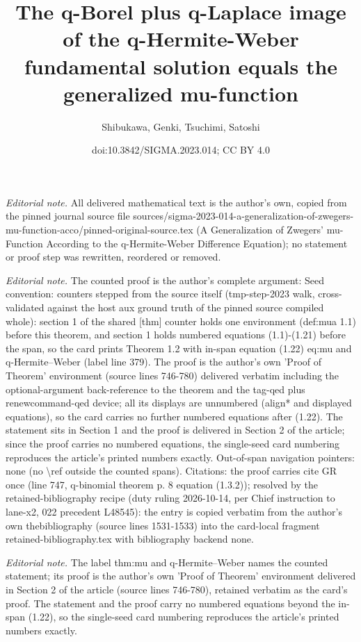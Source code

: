 \documentclass[10pt,a4paper]{article}
\title{The q-Borel plus q-Laplace image of the q-Hermite-Weber fundamental solution equals the generalized mu-function}
\author{Shibukawa, Genki, Tsuchimi, Satoshi}
\date{doi:10.3842/SIGMA.2023.014; CC BY 4.0}
\numberwithin{equation}{section}
\theoremstyle{definition}
\begin{document}
\maketitle
\setcounter{section}{1}
\setcounter{thm}{1}
\setcounter{equation}{21}
\noindent\textit{Editorial note.} All delivered mathematical text is the author's own, copied from the pinned journal source file sources/sigma-2023-014-a-generalization-of-zwegers-mu-function-acco/pinned-original-source.tex (A Generalization of Zwegers' mu-Function According to the q-Hermite-Weber Difference Equation); no statement or proof step was rewritten, reordered or removed.\par\medskip
\noindent\textit{Editorial note.} The counted proof is the author's complete argument: Seed convention: counters stepped from the source itself (tmp-step-2023 walk, cross-validated against the host aux ground truth of the pinned source compiled whole): section 1 of the shared [thm] counter holds one environment (def:mua 1.1) before this theorem, and section 1 holds numbered equations (1.1)-(1.21) before the span, so the card prints Theorem 1.2 with in-span equation (1.22) eq:mu and q-Hermite--Weber (label line 379). The proof is the author's own 'Proof of Theorem' environment (source lines 746-780) delivered verbatim including the optional-argument back-reference to the theorem and the tag-qed plus renewcommand-qed device; all its displays are unnumbered (align* and displayed equations), so the card carries no further numbered equations after (1.22). The statement sits in Section 1 and the proof is delivered in Section 2 of the article; since the proof carries no numbered equations, the single-seed card numbering reproduces the article's printed numbers exactly. Out-of-span navigation pointers: none (no \textbackslash{}ref outside the counted spans). Citations: the proof carries cite GR once (line 747, q-binomial theorem p. 8 equation (1.3.2)); resolved by the retained-bibliography recipe (duty ruling 2026-10-14, per Chief instruction to lane-x2, 022 precedent L48545): the entry is copied verbatim from the author's own thebibliography (source lines 1531-1533) into the card-local fragment retained-bibliography.tex with bibliography backend none.\par\medskip
\noindent\textit{Editorial note.} The label thm:mu and q-Hermite--Weber names the counted statement; its proof is the author's own 'Proof of Theorem' environment delivered in Section 2 of the article (source lines 746-780), retained verbatim as the card's proof. The statement and the proof carry no numbered equations beyond the in-span (1.22), so the single-seed card numbering reproduces the article's printed numbers exactly.\par\medskip
\end{document}
